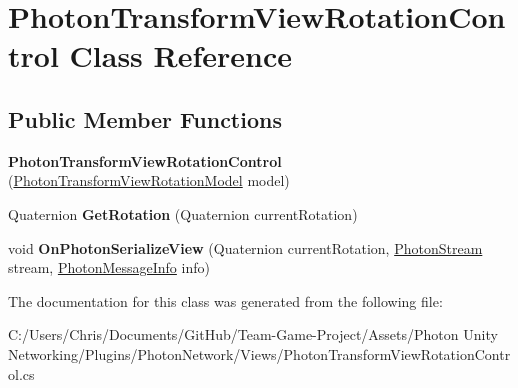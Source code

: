 \hypertarget{class_photon_transform_view_rotation_control}{}\section{Photon\+Transform\+View\+Rotation\+Control Class Reference}
\label{class_photon_transform_view_rotation_control}
\subsection*{Public Member Functions}
\begin{DoxyCompactItemize}
\item 
{\bfseries Photon\+Transform\+View\+Rotation\+Control} (\hyperlink{class_photon_transform_view_rotation_model}{Photon\+Transform\+View\+Rotation\+Model} model)\hypertarget{class_photon_transform_view_rotation_control_af96141a535c6d346ea4564ab3e783b57}{}\label{class_photon_transform_view_rotation_control_af96141a535c6d346ea4564ab3e783b57}

\item 
Quaternion {\bfseries Get\+Rotation} (Quaternion current\+Rotation)\hypertarget{class_photon_transform_view_rotation_control_a76f5079286a1db6632ed646b5f06a5db}{}\label{class_photon_transform_view_rotation_control_a76f5079286a1db6632ed646b5f06a5db}

\item 
void {\bfseries On\+Photon\+Serialize\+View} (Quaternion current\+Rotation, \hyperlink{class_photon_stream}{Photon\+Stream} stream, \hyperlink{class_photon_message_info}{Photon\+Message\+Info} info)\hypertarget{class_photon_transform_view_rotation_control_ab52d02c6493092feed0d1c63e4da2d4b}{}\label{class_photon_transform_view_rotation_control_ab52d02c6493092feed0d1c63e4da2d4b}

\end{DoxyCompactItemize}


The documentation for this class was generated from the following file\+:\begin{DoxyCompactItemize}
\item 
C\+:/\+Users/\+Chris/\+Documents/\+Git\+Hub/\+Team-\/\+Game-\/\+Project/\+Assets/\+Photon Unity Networking/\+Plugins/\+Photon\+Network/\+Views/Photon\+Transform\+View\+Rotation\+Control.\+cs\end{DoxyCompactItemize}
